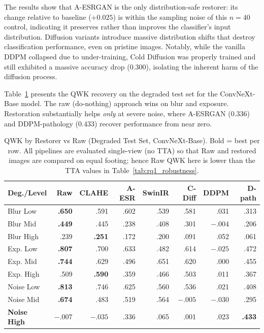 \documentclass[runningheads]{llncs}
\begin{document}
The results show that A-ESRGAN is the only distribution-safe restorer: its change relative to baseline ($+0.025$) is within the sampling noise of this $n=40$ control, indicating it preserves rather than improves the classifier's input distribution. Diffusion variants introduce massive distribution shifts that destroy classification performance, even on pristine images. Notably, while the vanilla DDPM collapsed due to under-training, Cold Diffusion was properly trained and still exhibited a massive accuracy drop (0.300), isolating the inherent harm of the diffusion process.

Table~\ref{tab:qwk_recovery} presents the QWK recovery on the degraded test set for the ConvNeXt-Base model. The raw (do-nothing) approach wins on blur and exposure. Restoration substantially helps \textit{only} at severe noise, where A-ESRGAN (0.336) and DDPM-pathology (0.433) recover performance from near zero.

\begin{table}[!t]
\caption{QWK by Restorer vs Raw (Degraded Test Set, ConvNeXt-Base). Bold = best per row. All pipelines are evaluated single-view (no TTA) so that Raw and restored images are compared on equal footing; hence Raw QWK here is lower than the TTA values in Table~\ref{tab:rq1_robustness}.}
\label{tab:qwk_recovery}
\begin{center}
\setlength{\tabcolsep}{3.5pt}
\small
\begin{tabular}{lrrrrrrr}
\toprule
\textbf{Deg./Level} & \textbf{Raw} & \textbf{CLAHE} & \textbf{A-ESR} & \textbf{SwinIR} & \textbf{C-Diff} & \textbf{DDPM} & \textbf{D-path} \\
\midrule
Blur Low      & \textbf{.650} & .591 & .602 & .539 & .581 & .031 & .313 \\
Blur Mid      & \textbf{.449} & .445 & .238 & .408 & .301 & $-.004$ & .206 \\
Blur High     & .239 & \textbf{.251} & .172 & .200 & .091 & .052 & .061 \\
Exp. Low      & \textbf{.807} & .700 & .633 & .482 & .614 & $-.025$ & .472 \\
Exp. Mid      & \textbf{.744} & .629 & .496 & .651 & .620 & .000 & .455 \\
Exp. High     & .509 & \textbf{.590} & .359 & .466 & .503 & .011 & .367 \\
Noise Low     & \textbf{.813} & .746 & .625 & .560 & .536 & .021 & .408 \\
Noise Mid     & \textbf{.674} & .483 & .519 & .564 & $-.005$ & $-.030$ & .295 \\
\textbf{Noise High} & $-.007$ & $-.035$ & .336 & .065 & .001 & .023 & \textbf{.433} \\
\bottomrule
\end{tabular}
\end{center}
\end{table}
\end{document}

